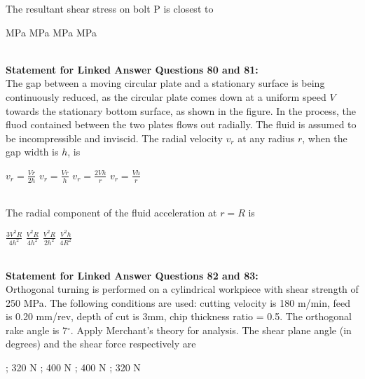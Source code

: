 \documentclass[addpoints,11pt]{exam}
\begin{document}
\begin{questions}
    \question The resultant shear stress on bolt P is closest to\\

    \begin{oneparchoices}
         MPa
         MPa
         MPa
         MPa
    \end{oneparchoices}\\

\normalsize\textbf{Statement for Linked Answer Questions 80 and 81:}\\
The gap between a moving circular plate and a stationary surface is being continuously reduced, as the circular plate comes down at a uniform speed $V$ towards the stationary bottom surface, as shown in the figure. In the process, the fluod contained between the two plates flows out radially. The fluid is assumed to be incompressible and inviscid.%
    \question The radial velocity $v_r$ at any radius $r$, when the gap width is $h$, is\\

    \begin{oneparchoices}
        \choice $v_r = \frac{Vr}{2h}$
        \choice $v_r = \frac{Vr}{h}$
        \choice $v_r = \frac{2Vh}{r}$
        \choice $v_r = \frac{Vh}{r}$
    \end{oneparchoices}\\

    \question The radial component of the fluid acceleration at $r=R$ is\\
    
    \begin{oneparchoices}
        \choice $\frac{3V^2R}{4h^2}$
        \choice $\frac{V^2R}{4h^2}$
        \choice $\frac{V^2R}{2h^2}$
        \choice $\frac{V^2h}{4R^2}$
    \end{oneparchoices}\\
    
\normalsize\textbf{Statement for Linked Answer Questions 82 and 83:}\\
Orthogonal turning is performed on a cylindrical workpiece with shear strength of 250 MPa. The following conditions are used: cutting velocity is 180 m/min, feed is 0.20 mm/rev, depth of cut is 3mm, chip thickness ratio = 0.5. The orthogonal rake angle is 7$^\circ$. Apply Merchant's theory for analysis.
    \question The shear plane angle (in degrees) and the shear force respectively are\\

    \begin{oneparchoices}
         ; 320 N
         ; 400 N
         ; 400 N
         ; 320 N
    \end{oneparchoices}\\


\end{questions}
\end{document}
